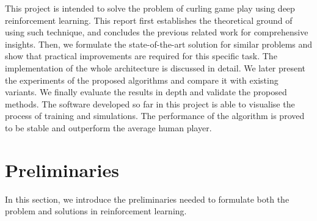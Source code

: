 \documentclass[oneside,11pt,a4paper]{article}
\begin{document}
\newline
\newline
\noindent
This project is intended to solve the problem of curling game play using deep reinforcement learning. This report first establishes the theoretical ground of using such technique, and concludes the previous related work for comprehensive insights. Then, we formulate the state-of-the-art solution for similar problems and show that practical improvements are required for this specific task. The implementation of the whole architecture is discussed in detail. We later present the experiments of the proposed algorithms and compare it with existing variants. We finally evaluate the results in depth and validate the proposed methods. The software developed so far in this project is able to visualise the process of training and simulations. The performance of the algorithm is proved to be stable and outperform the average human player.

\newpage
\section{Preliminaries}
In this section, we introduce the preliminaries needed to formulate both the problem and solutions in reinforcement learning.
\end{document}
